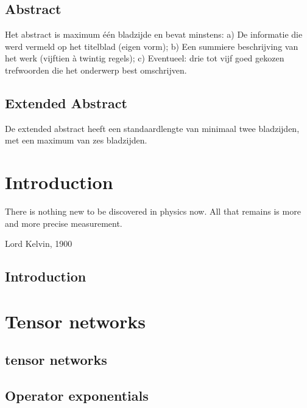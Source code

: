 \documentclass{book}
\begin{document}

\section*{Abstract}

Het abstract is maximum één bladzijde en bevat minstens:
a) De informatie die werd vermeld op het titelblad (eigen vorm);
b) Een summiere beschrijving van het werk (vijftien à twintig regels);
c) Eventueel: drie tot vijf goed gekozen trefwoorden die het onderwerp best
omschrijven.


\section*{Extended Abstract}

De extended abstract heeft een standaardlengte van minimaal twee bladzijden, met een maximum van zes bladzijden.

\tableofcontents

\listoffigures

\mainmatter

\chapter{Introduction}

\epigraph{There is nothing new to be discovered in physics now. All that remains is more and more precise measurement.}{Lord Kelvin, 1900}

\section{Introduction}


\chapter{Tensor networks}

\section{tensor networks}


\section{Operator exponentials}

\end{document}
